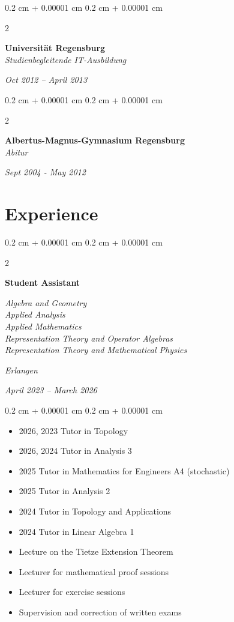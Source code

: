 \documentclass[10pt, letterpaper]{article}
\newenvironment{highlights}{
    \begin{itemize}[
        topsep=0.10 cm,
        parsep=0.10 cm,
        partopsep=0pt,
        itemsep=0pt,
        leftmargin=0.4 cm + 10pt
    ]
}{
    \end{itemize}
}
\newenvironment{onecolentry}{
    \begin{adjustwidth}{
        0.2 cm + 0.00001 cm
    }{
        0.2 cm + 0.00001 cm
    }
}{
    \end{adjustwidth}
}
\newenvironment{twocolentry}[2][]{
    \onecolentry
    \def\secondColumn{#2}
    \setcolumnwidth{\fill, 4.5 cm}
    \begin{paracol}{2}
}{
    \switchcolumn \raggedleft \secondColumn
    \end{paracol}
    \endonecolentry
}
\begin{document}
\vspace{0.10 cm}
\begin{twocolentry}{           
	\textit{Oct 2012 – April 2013}}
	\textbf{Universität Regensburg} \\
	\textit{Studienbegleitende IT-Ausbildung}
\end{twocolentry}

\vspace{0.10 cm}
\begin{twocolentry}{           
	\textit{Sept 2004 - May 2012}}
	\textbf{Albertus-Magnus-Gymnasium Regensburg} \\
	\textit{Abitur}
\end{twocolentry}



    
\section{Experience}
\begin{twocolentry}{
    \textit{Erlangen}    
    
    \textit{April 2023 – March 2026}}
    \textbf{Student Assistant}
    
    \textit{Algebra and Geometry \\ Applied Analysis \\ Applied Mathematics \\ Representation Theory and Operator Algebras \\ Representation Theory and Mathematical Physics}
\end{twocolentry}

\vspace{0.10 cm}
\begin{onecolentry}
	\begin{highlights}
        \item 2026, 2023 Tutor in Topology
        \item 2026, 2024 Tutor in Analysis 3
		\item 2025 Tutor in Mathematics for Engineers A4 (stochastic)
        \item 2025 Tutor in Analysis 2
        \item 2024 Tutor in Topology and Applications
        \item 2024 Tutor in Linear Algebra 1
        \item Lecture on the Tietze Extension Theorem
        \item Lecturer for mathematical proof sessions
        \item Lecturer for exercise sessions
        \item Supervision and correction of written exams
	\end{highlights}
\end{onecolentry}
\vspace{0.2 cm}
\end{document}
